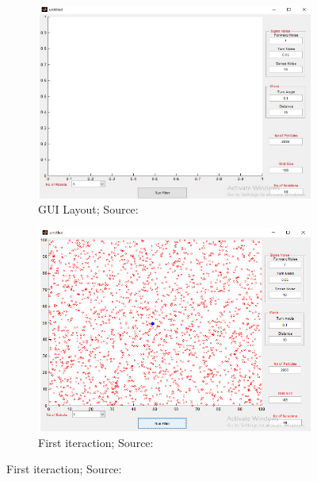 \begin{figure}[H]
    \centering
    \begin{subfigure}{0.49\textwidth}
        \includegraphics[width=\textwidth]{figures/gui_layout_mcl_1.png}
        \caption[GUI Layout]{GUI Layout; Source: \citet{sushant_localization_2017}}
    \end{subfigure}
    \hfill
    \begin{subfigure}{0.49\textwidth}
        \includegraphics[width=\textwidth]{figures/gui_layout_mcl_2.png}
        \caption[First iteraction]{First iteraction; Source: \citet{sushant_localization_2017}}
    \end{subfigure}


\end{figure}

